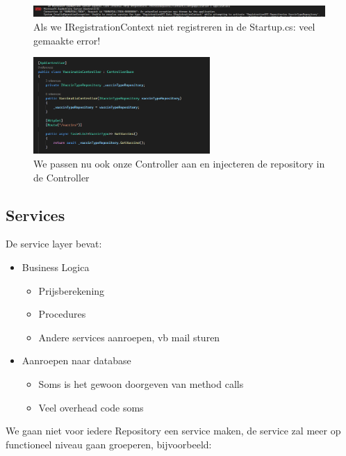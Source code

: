 \documentclass{article}
\begin{document}
\begin{figure}[H]
    \centering
    \includegraphics[width=0.99\textwidth]{dependency-injection-3.png}
    \caption{Als we IRegistrationContext niet registreren in de Startup.cs: veel gemaakte error!}
\end{figure}

\begin{figure}[H]
    \centering
    \includegraphics[width=0.6\textwidth]{dependency-injection-4.png}
    \caption{We passen nu ook onze Controller aan en injecteren de repository in de Controller}
\end{figure}

\subsection{Services}

De service layer bevat:

\begin{itemize}
    \item Business Logica
    \begin{itemize}
        \item Prijsberekening
        \item Procedures
        \item Andere services aanroepen, vb mail sturen
    \end{itemize}
    \item Aanroepen naar database
    \begin{itemize}
        \item Soms is het gewoon doorgeven van method calls
        \item Veel overhead code soms
    \end{itemize}
\end{itemize}

We gaan niet voor iedere Repository een service maken, de service zal meer op functioneel niveau gaan groeperen, bijvoorbeeld:
\end{document}
